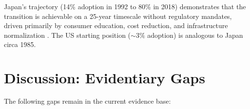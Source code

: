 \documentclass[aps,prfluids,reprint,amsmath,amssymb,floatfix]{revtex4-2}
\begin{document}
Japan's trajectory (14\% adoption in 1992 to 80\% in 2018) demonstrates
that the transition is achievable on a 25-year timescale without regulatory
mandates, driven primarily by consumer education, cost reduction, and
infrastructure normalization \citep{JapaneseCabinet2018}. The US starting
position ($\sim3\%$ adoption) is analogous to Japan circa 1985.

\section{Discussion: Evidentiary Gaps}
\label{sec:discussion}

The following gaps remain in the current evidence base:
\end{document}
